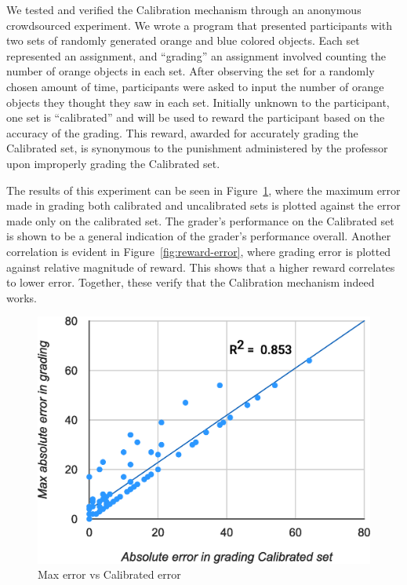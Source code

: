 \documentclass{chi-ext}
\begin{document}
We tested and verified the Calibration mechanism through an anonymous crowdsourced experiment. We wrote a program that presented participants with two sets of randomly generated orange and blue colored objects. Each set represented an assignment, and ``grading'' an assignment involved counting the number of orange objects in each set. After observing the set for a randomly chosen amount of time, participants were asked to input the number of orange objects they thought they saw in each set. Initially unknown to the participant, one set is ``calibrated'' and will be used to reward the participant based on the accuracy of the grading. This reward, awarded for accurately grading the Calibrated set, is synonymous to the punishment administered by the professor upon improperly grading the Calibrated set.

The results of this experiment can be seen in Figure~\ref{fig:error-calibration}, where the maximum error made in grading both calibrated and uncalibrated sets is plotted against the error made only on the calibrated set. The grader's performance on the Calibrated set is shown to be a general indication of the grader's performance overall. Another correlation is evident in Figure~\ref{fig:reward-error}, where grading error is plotted against relative magnitude of reward. This shows that a higher reward correlates to lower error. Together, these verify that the Calibration mechanism indeed works.

\begin{figure}
  \centering
  \includegraphics[width=\linewidth]{Error-Calibration-Graph.eps}
  \caption{Max error vs Calibrated error}
  \label{fig:error-calibration}
\end{figure}
\end{document}

